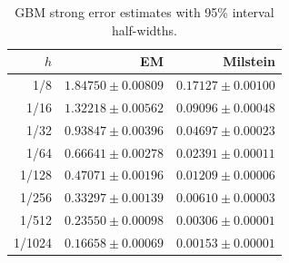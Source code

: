 \begin{table}[H]\centering\small
\caption{GBM strong error estimates with 95\% interval half-widths.}
\label{tab:gbm-strong}
\begin{tabular}{rrr}\toprule
$h$ & EM & Milstein\\\midrule
1/8 & $1.84750\pm0.00809$ & $0.17127\pm0.00100$\\
1/16 & $1.32218\pm0.00562$ & $0.09096\pm0.00048$\\
1/32 & $0.93847\pm0.00396$ & $0.04697\pm0.00023$\\
1/64 & $0.66641\pm0.00278$ & $0.02391\pm0.00011$\\
1/128 & $0.47071\pm0.00196$ & $0.01209\pm0.00006$\\
1/256 & $0.33297\pm0.00139$ & $0.00610\pm0.00003$\\
1/512 & $0.23550\pm0.00098$ & $0.00306\pm0.00001$\\
1/1024 & $0.16658\pm0.00069$ & $0.00153\pm0.00001$\\
\bottomrule\end{tabular}
\end{table}
